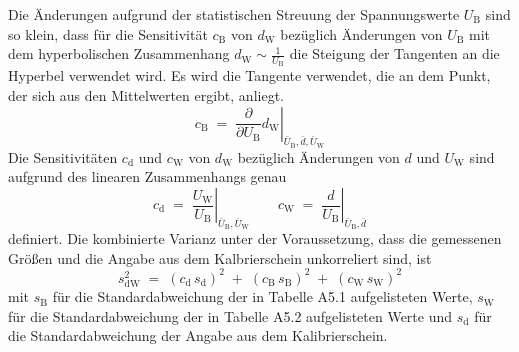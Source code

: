 Die Änderungen aufgrund der statistischen Streuung der Spannungswerte $U_\mathrm{B}$ sind
so klein, dass für die Sensitivität $c_\mathrm{B}$ von $d_\mathrm{W}$
bezüglich Änderungen von $U_\mathrm{B}$
mit dem hyperbolischen Zusammenhang $d_\mathrm{W} \sim \frac{1}{U_\mathrm{B}}$ 
die Steigung der Tangenten an die Hyperbel verwendet wird. Es wird die
Tangente verwendet, die an dem Punkt, der sich aus den Mittelwerten
ergibt, anliegt.
\begin{equation}
c_\mathrm{B} \; = \; \left. \frac{\partial}{\partial U_\mathrm{B}}
 d_\mathrm{W} \right|_{\bar U_\mathrm{B}, \bar d, \bar U_\mathrm{W}}
\end{equation}
Die Sensitivitäten $c_\mathrm{d}$ und $c_\mathrm{W}$ von $d_\mathrm{W}$
bezüglich Änderungen von $d$ und $U_\mathrm{W}$ sind aufgrund des
linearen Zusammenhangs genau
\begin{equation}
c_\mathrm{d} \; = \; \left. \frac{U_\mathrm{W}}{U_\mathrm{B}} \right|_{\bar U_\mathrm{B}, \bar U_\mathrm{W}} \qquad
c_\mathrm{W} \; = \; \left. \frac{d}{U_\mathrm{B}} \right|_{\bar U_\mathrm{B}, \bar d}
\end{equation}
definiert.
Die kombinierte Varianz unter der Voraussetzung, dass die gemessenen Größen und
die Angabe aus dem Kalbrierschein unkorreliert sind, ist
\begin{equation}
s_\mathrm{dW}^2 \; = \; (c_\mathrm{d} \, s_\mathrm{d})^2 \; + \; 
(c_\mathrm{B} \, s_\mathrm{B})^2 \; + \; (c_\mathrm{W} \, s_\mathrm{W})^2
\end{equation}
mit $s_\mathrm{B}$ für die Standardabweichung der in Tabelle A5.1 aufgelisteten Werte,
$s_\mathrm{W}$ für die Standardabweichung der in Tabelle A5.2 aufgelisteten Werte und
$s_\mathrm{d}$ für die Standardabweichung der Angabe aus dem Kalibrierschein.

